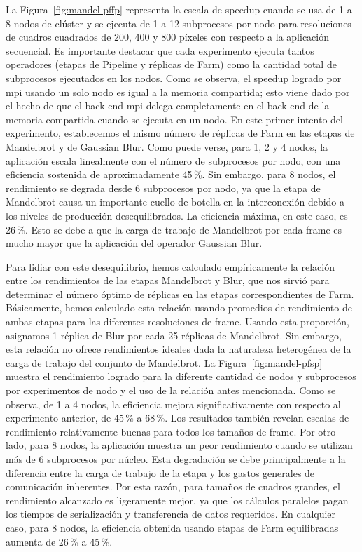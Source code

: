 La Figura~\ref{fig:mandel-pffp} representa la escala de speedup cuando se usa de 1 a 8 nodos de clúster y se ejecuta de 1 a 12 subprocesos por nodo para resoluciones de cuadros cuadrados de 200, 400 y 800 píxeles con respecto a la aplicación secuencial. Es importante destacar que cada experimento ejecuta tantos operadores (etapas de Pipeline y réplicas de Farm) como la cantidad total de subprocesos ejecutados en los nodos. Como se observa, el speedup logrado por \acrshort{mpi} usando un solo nodo es igual a la memoria compartida; esto viene dado por el hecho de que el back-end \acrshort{mpi} delega completamente en el back-end de la memoria compartida cuando se ejecuta en un nodo. En este primer intento del experimento, establecemos el mismo número de réplicas de Farm en las etapas de Mandelbrot y de Gaussian Blur. Como puede verse, para 1, 2 y 4 nodos, la aplicación escala linealmente con el número de subprocesos por nodo, con una eficiencia sostenida de aproximadamente 45\,\%. Sin embargo, para 8 nodos, el rendimiento se degrada desde 6 subprocesos por nodo, ya que la etapa de Mandelbrot causa un importante cuello de botella en la interconexión debido a los niveles de producción desequilibrados. La eficiencia máxima, en este caso, es 26\,\%. Esto se debe a que la carga de trabajo de Mandelbrot por cada frame es mucho mayor que la aplicación del operador Gaussian Blur.

Para lidiar con este desequilibrio, hemos calculado empíricamente la relación entre los rendimientos de las etapas Mandelbrot y Blur, que nos sirvió para determinar el número óptimo de réplicas en las etapas correspondientes de Farm. Básicamente, hemos calculado esta relación usando promedios de rendimiento de ambas etapas para las diferentes resoluciones de frame. Usando esta proporción, asignamos 1 réplica de Blur por cada 25 réplicas de Mandelbrot. Sin embargo, esta relación no ofrece rendimientos ideales dada la naturaleza heterogénea de la carga de trabajo del conjunto de Mandelbrot. La Figura~\ref{fig:mandel-pfsp} muestra el rendimiento logrado para la diferente cantidad de nodos y subprocesos por experimentos de nodo y el uso de la relación antes mencionada. Como se observa, de 1 a 4 nodos, la eficiencia mejora significativamente con respecto al experimento anterior, de 45\,\% a 68\,\%. Los resultados también revelan escalas de rendimiento relativamente buenas para todos los tamaños de frame.  Por otro lado, para 8 nodos, la aplicación muestra un peor rendimiento cuando se utilizan más de 6 subprocesos por núcleo. Esta degradación se debe principalmente a la diferencia entre la carga de trabajo de la etapa y los gastos generales de comunicación inherentes. Por esta razón, para tamaños de cuadros grandes, el rendimiento alcanzado es ligeramente mejor, ya que los cálculos paralelos pagan los tiempos de serialización y transferencia de datos requeridos. En cualquier caso, para 8 nodos, la eficiencia obtenida usando etapas de Farm equilibradas aumenta de 26\,\% a 45\,\%.


